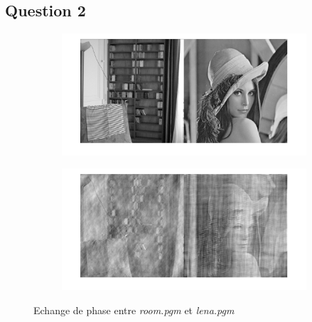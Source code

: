 \documentclass[12pt,a4paper,onecolumn]{article}
\begin{document}
\subsection{Question 2}

\begin{figure}[H]
	\centering
	\begin{subfigure}[b]{\textwidth}
		\centering
		\includegraphics[height = 0.30\textheight]{10_1_21}
		\label{10_1_21}
	\end{subfigure}
	\begin{subfigure}[b]{\textwidth}
		\centering
		\includegraphics[height = 0.30\textheight]{10_1_22}
		\label{10_1_22}
	\end{subfigure}
	\caption{Echange de phase entre \textit{room.pgm} et \textit{lena.pgm}}
	\label{10_2}
\end{figure}
\end{document}
